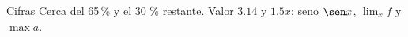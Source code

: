\documentclass{beamer}
\begin{document}
\begin{frame}{Cifras}
Cerca del 65\,\% y el 30 \% restante. Valor $3.14$ y $1.5x$; seno $\sen x$, $\lim_{x} f$ y $\max a$.
\end{frame}
\end{document}
